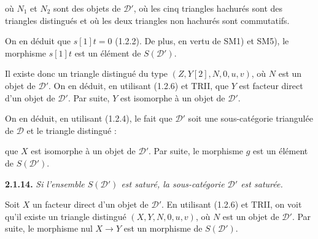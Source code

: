 \noindent où $N_1$ et $N_2$ sont des objets de $\mathcal D'$, où les cinq
triangles hachurés sont des triangles distingués et où les deux triangles
non hachurés sont commutatifs.

On en déduit que $s[1]t=0$ (1.2.2).
%
De plus, en vertu de SM1) et SM5), le
morphisme $s[1]t$ est un élément de $S(\mathcal D')$.

Il existe donc un triangle distingué du type $(Z,Y[2],N,0,u,v)$, où $N$ est
un objet de $\mathcal D'$.
%
On en déduit, en utilisant (1.2.6) et TRII, que $Y$ est facteur direct d'un
objet de $\mathcal D'$.
%
Par suite, $Y$ est
isomorphe à un objet de $\mathcal D'$.

On en déduit, en utilisant (1.2.4), le fait que $\mathcal D'$ soit une
sous-catégorie triangulée de $\mathcal D$ et le triangle distingué :

\begin{center}
\end{center}

\noindent que $X$ est isomorphe à un objet de $\mathcal D'$. Par suite, le
morphisme $g$ est un élément de $S(\mathcal D')$.

\medskip
\noindent\textbf{2.1.14.}\quad
{}%
\emph{Si l'ensemble $S(\mathcal D')$ est saturé, la sous-catégorie
$\mathcal D'$ est saturée.}

Soit $X$ un facteur direct d'un objet de $\mathcal D'$.
%
En utilisant (1.2.6)
et TRII, on voit qu'il existe un triangle distingué $(X,Y,N,0,u,v)$, où $N$
est un objet de $\mathcal D'$.
%
Par suite, le morphisme nul $X\to Y$ est un
morphisme de $S(\mathcal D')$.

